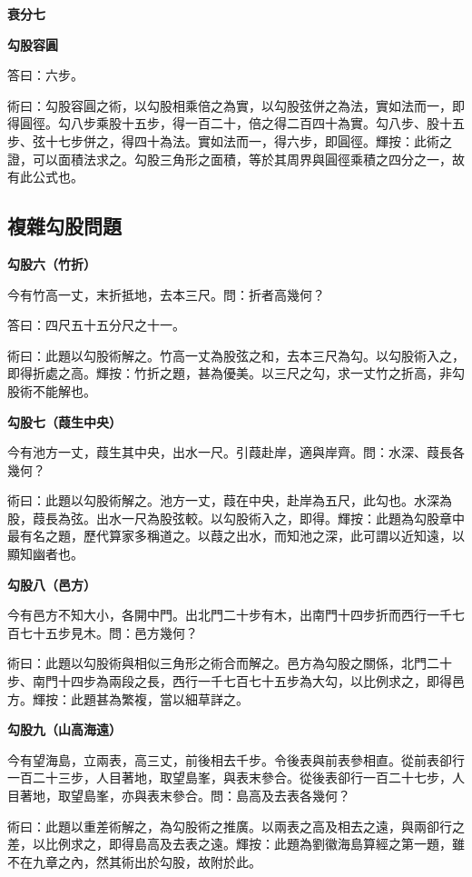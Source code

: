 \documentclass[11pt,a4paper]{article}
\newenvironment{problemenv}[1]{%
  \medskip\noindent\textbf{#1}\par\nopagebreak\smallskip
}{\medskip}
\begin{document}
\begin{problemenv}{衰分七}
\begin{problemenv}{勾股容圓}
\textsf{答曰：}六步。

\textsf{術曰：}勾股容圓之術，以勾股相乘倍之為實，以勾股弦併之為法，實如法而一，即得圓徑。勾八步乘股十五步，得一百二十，倍之得二百四十為實。勾八步、股十五步、弦十七步併之，得四十為法。實如法而一，得六步，即圓徑。輝按：此術之證，可以面積法求之。勾股三角形之面積，等於其周界與圓徑乘積之四分之一，故有此公式也。
\end{problemenv}

\subsection{複雜勾股問題}

\begin{problemenv}{勾股六（竹折）}
今有竹高一丈，末折抵地，去本三尺。問：折者高幾何？

\textsf{答曰：}四尺五十五分尺之十一。

\textsf{術曰：}此題以勾股術解之。竹高一丈為股弦之和，去本三尺為勾。以勾股術入之，即得折處之高。輝按：竹折之題，甚為優美。以三尺之勾，求一丈竹之折高，非勾股術不能解也。
\end{problemenv}

\begin{problemenv}{勾股七（葭生中央）}
今有池方一丈，葭生其中央，出水一尺。引葭赴岸，適與岸齊。問：水深、葭長各幾何？

\textsf{術曰：}此題以勾股術解之。池方一丈，葭在中央，赴岸為五尺，此勾也。水深為股，葭長為弦。出水一尺為股弦較。以勾股術入之，即得。輝按：此題為勾股章中最有名之題，歷代算家多稱道之。以葭之出水，而知池之深，此可謂以近知遠，以顯知幽者也。
\end{problemenv}

\begin{problemenv}{勾股八（邑方）}
今有邑方不知大小，各開中門。出北門二十步有木，出南門十四步折而西行一千七百七十五步見木。問：邑方幾何？

\textsf{術曰：}此題以勾股術與相似三角形之術合而解之。邑方為勾股之關係，北門二十步、南門十四步為兩段之長，西行一千七百七十五步為大勾，以比例求之，即得邑方。輝按：此題甚為繁複，當以細草詳之。
\end{problemenv}

\begin{problemenv}{勾股九（山高海遠）}
今有望海島，立兩表，高三丈，前後相去千步。令後表與前表參相直。從前表卻行一百二十三步，人目著地，取望島峯，與表末參合。從後表卻行一百二十七步，人目著地，取望島峯，亦與表末參合。問：島高及去表各幾何？

\textsf{術曰：}此題以重差術解之，為勾股術之推廣。以兩表之高及相去之遠，與兩卻行之差，以比例求之，即得島高及去表之遠。輝按：此題為劉徽海島算經之第一題，雖不在九章之內，然其術出於勾股，故附於此。
\end{problemenv}


\end{problemenv}
\end{document}
